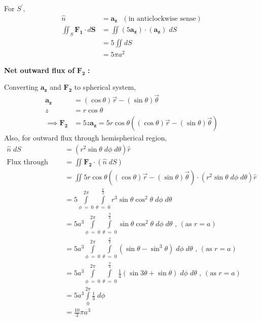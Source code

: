 \documentclass[12pt]{article}
\providecommand{\brak}[1]{\ensuremath{\left(#1\right)}}
\begin{document}
For $S^\prime$,
\begin{align*}
    \hat{n} &= \mathbf{a_z} \text{ } \brak{\text{in anticlockwise sense}}\\
    \iint_S \mathbf{F_1} \cdot d\mathbf{S} &= \iint \brak{5\mathbf{a_z}}\cdot\brak{\mathbf{a_z}} \; dS\\
    &= 5\iint dS\\
    &= 5\pi a^2
\end{align*}

\textbf{Net outward flux of} $\mathbf{F_2}$ \textbf{:}

Converting $\mathbf{a_z}$ and $\mathbf{F_2}$ to spherical system,
\begin{align*}
    \mathbf{a_z} &= \brak{\cos{\theta}} \vec{r} - \brak{\sin{\theta}} \vec{\theta}\\
    z &= r\cos{\theta}\\
    \implies \mathbf{F_2} &= 5 z\mathbf{a_z} = 5r\cos{\theta} \brak{\brak{\cos{\theta}} \vec{r} - \brak{\sin{\theta}} \vec{\theta}}
\end{align*}
Also, for outward flux through hemispherical region,
\begin{align*}
    \hat{n}\; dS &= \brak{r^2\sin{\theta}\; d\phi \; d\theta} \hat{r}\\
    \text{Flux through hemisphere} &= \iint \mathbf{F_2}\cdot\brak{\hat{n} \; dS}\\
    &= \iint 5r\cos{\theta} \brak{\brak{\cos{\theta}} \vec{r} - \brak{\sin{\theta}} \vec{\theta}} \cdot \brak{r^2\sin{\theta}\; d\phi \; d\theta} \hat{r}\\
    &= 5\int\limits_{\phi \;=\; 0}^{2\pi}\int\limits_{\theta \;=\; 0}^{\frac{\pi}{2}} r^3 \sin{\theta} \cos^2{\theta} \; d\phi \; d\theta\\
    &= 5a^3 \int\limits_{\phi \;=\; 0}^{2\pi}\int\limits_{\theta \;=\; 0}^{\frac{\pi}{2}} \sin{\theta} \cos^2{\theta} \; d\phi \; d\theta \text{ , } \brak{\text{as } r = a}\\
    &= 5a^3 \int\limits_{\phi \;=\; 0}^{2\pi}\int\limits_{\theta \;=\; 0}^{\frac{\pi}{2}} \brak{\sin{\theta} - \sin^3{\theta}} \; d\phi \; d\theta \text{ , } \brak{\text{as } r = a}\\
    &= 5a^3 \int\limits_{\phi \;=\; 0}^{2\pi}\int\limits_{\theta \;=\; 0}^{\frac{\pi}{2}} \frac{1}{4}\brak{\sin{3\theta} + \sin{\theta}} \; d\phi \; d\theta \text{ , } \brak{\text{as } r = a}\\
    &= 5a^3 \int\limits_{0}^{2\pi} \frac{1}{3} \; d\phi\\
    &= \frac{10}{3}\pi a^3
\end{align*}
\end{document}

